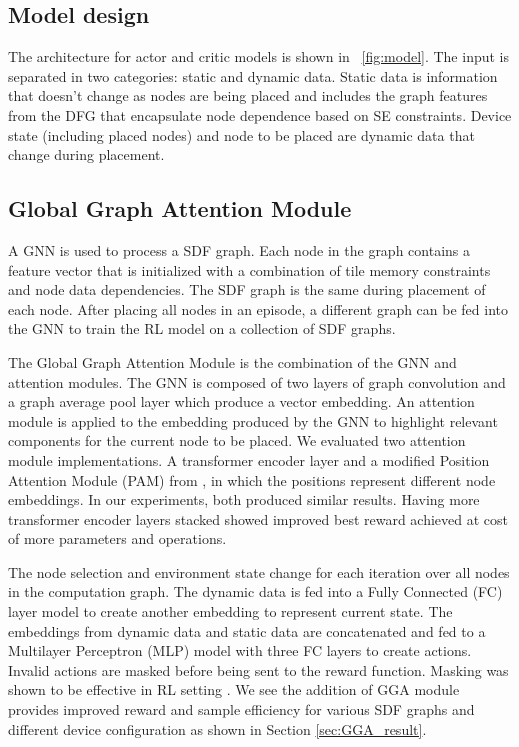 \subsection{Model design}
The architecture for actor and critic models is shown in \figurename~\ref{fig:model}.
The input is separated in two categories: static and dynamic data. 
Static data is information that doesn't change as nodes are being placed and includes the graph features from the DFG that encapsulate node dependence based on SE constraints.
Device state (including placed nodes) and node to be placed are dynamic data that change during placement.

\subsection{Global Graph Attention Module}

A GNN is used to process a SDF graph. 
Each node in the graph contains a feature vector that is initialized with a combination of tile memory constraints and node data dependencies. 
The SDF graph is the same during placement of each node. 
After placing all nodes in an episode, a different graph can be fed into the GNN to train the RL model on a collection of SDF graphs. 

The Global Graph Attention Module is the combination of the GNN and attention modules.
The GNN is composed of two layers of graph convolution \cite{wu2019simplifying} and a graph average pool layer which produce a vector embedding.
An attention module is applied to the embedding produced by the GNN to highlight relevant components for the current node to be placed. 
We evaluated two attention module implementations. A transformer encoder layer \cite{vaswani2017attention} and a modified Position Attention Module (PAM) from \cite{fu2019dual}, in which the positions represent different node embeddings.
In our experiments, both produced similar results. 
Having more transformer encoder layers stacked showed improved best reward achieved at cost of more parameters and operations.

The node selection and environment state change for each iteration over all nodes in the computation graph. 
The dynamic data is fed into a Fully Connected (FC) layer model to create another embedding to represent current state. 
The embeddings from dynamic data and static data are concatenated and fed to a Multilayer Perceptron (MLP) model with three FC layers to create actions. 
Invalid actions are masked before being sent to the reward function. 
Masking was shown to be effective in RL setting \cite{Shengyi_mask}.
We see the addition of GGA module provides improved reward and sample efficiency for various SDF graphs and different device configuration as shown in Section \ref{sec:GGA_result}.

